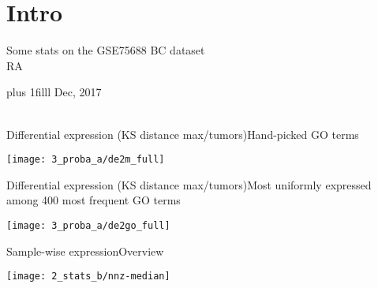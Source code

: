 \documentclass[onepage]{beamer}
\author{\small RA}
\makeatletter
\newcommand{\EMAIL}{{\color{blue}randreev{\tiny\color{white}.\hspace{-1.5pt}}@{\tiny\color{white}.\hspace{-1.5pt}}stat.sinica.edu.tw}}
\def\Bottom#1{\vskip 0pt plus 1filll #1}
\makeatother
\begin{document}

\section{Intro}



\begin{frame}[plain,t]
	\begin{center}
		Some stats on the GSE75688 BC dataset
		\\[1\baselineskip]
		\small
		RA

		\vspace{1cm}


	\end{center}

	\Bottom{
		\scriptsize
		\hfill
		Dec, 2017
		\\ {\ }
	}
\end{frame}



\begin{frame}[t]{Differential expression (KS distance max/tumors)}{Hand-picked GO terms}
	\begin{center}
		\texttt{[image: 3\_proba\_a/de2m\_full]}
	\end{center}
\end{frame}


\begin{frame}[t]{Differential expression (KS distance max/tumors)}{Most uniformly expressed among 400 most frequent GO terms}
	\begin{center}
		\texttt{[image: 3\_proba\_a/de2go\_full]}
	\end{center}
\end{frame}


\begin{frame}[t]{Sample-wise expression}{Overview}
	\begin{center}
		\texttt{[image: 2\_stats\_b/nnz-median]}
	\end{center}
\end{frame}
\end{document}
